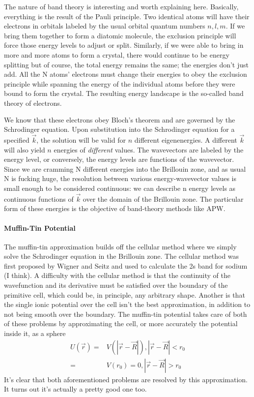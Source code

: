 \documentclass[11pt]{article}
\numberwithin{equation}{section}
\begin{document}
The nature of band theory is interesting and worth explaining here. Basically, everything is the result of the Pauli principle. Two identical atoms will have their electrons in orbitals labeled by the usual orbital quantum numbers $n,l,m$. If we bring them together to form a diatomic molecule, the exclusion principle will force those energy levels to adjust or split. Similarly, if we were able to bring in more and more atoms to form a crystal, there would continue to be energy splitting but of course, the total energy remains the same; the energies don't just add. All the N atoms' electrons must change their energies to obey the exclusion principle while spanning the energy of the individual atoms before they were bound to form the crystal. The resulting energy landscape is the so-called band theory of electrons.

We know that these electrons obey Bloch's theorem and are governed by the Schrodinger equation. Upon substitution into the Schrodinger equation for a specified $\vec{k}$, the solution will be valid for $n$ different eigenenergies. A different $\vec{k}$ will also yield $n$ energies of \textit{different} values. The wavevectors are labeled by the energy level, or conversely, the energy levels are functions of the wavevector. Since we are cramming N different energies into the Brillouin zone, and as usual N is fucking huge, the resolution between various energy-wavevector values is small enough to be considered continuous: we can describe n energy levels as continuous functions of $\vec{k}$ over the domain of the Brillouin zone. The particular form of these energies is the objective of band-theory methods like APW.

\paragraph{Muffin-Tin Potential}
The muffin-tin approximation builds off the cellular method where we simply solve the Schrodinger equation in the Brillouin zone. The cellular method was first proposed by Wigner and Seitz and used to calculate the 2s band for sodium (I think). A difficulty with the cellular method is that the continuity of the wavefunction and its derivative must be satisfied over the boundary of the primitive cell, which could be, in principle, any arbitrary shape. Another is that the single ionic potential over the cell isn't the best approximation, in addition to not being smooth over the boundary. The muffin-tin potential takes care of both of these problems by approximating the cell, or more accurately the potential inside it, as a sphere
\begin{align*}
U(\vec{r}) = &V(|\vec{r} - \vec{R}|), |\vec{r} - \vec{R}| < r_0 \\
= &V(r_0) = 0, |\vec{r} - \vec{R}| > r_0
\end{align*}
It's clear that both aforementioned problems are resolved by this approximation. It turns out it's actually a pretty good one too.
\end{document}
